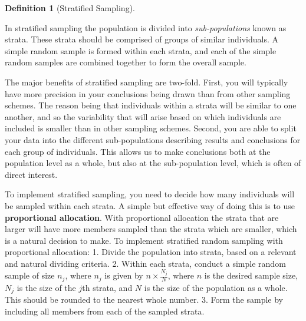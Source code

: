 \documentclass[
  letterpaper,
  DIV=11,
  numbers=noendperiod]{scrreprt}
\theoremstyle{definition}
\theoremstyle{definition}
\theoremstyle{definition}
\newtheorem{definition}{Definition}[chapter]
\theoremstyle{remark}
\begin{document}
\begin{definition}[Stratified
Sampling]\protect\hypertarget{def-stratified-sampling}{}\label{def-stratified-sampling}

In stratified sampling the population is divided into
\emph{sub-populations} known as strata. These strata should be comprised
of groups of similar individuals. A simple random sample is formed
within each strata, and each of the simple random samples are combined
together to form the overall sample.

\end{definition}

The major benefits of stratified sampling are two-fold. First, you will
typically have more precision in your conclusions being drawn than from
other sampling schemes. The reason being that individuals within a
strata will be similar to one another, and so the variability that will
arise based on which individuals are included is smaller than in other
sampling schemes. Second, you are able to split your data into the
different sub-populations describing results and conclusions for each
group of individuals. This allows us to make conclusions both at the
population level as a whole, but also at the sub-population level, which
is often of direct interest.

To implement stratified sampling, you need to decide how many
individuals will be sampled within each strata. A simple but effective
way of doing this is to use \textbf{proportional allocation}. With
proportional allocation the strata that are larger will have more
members sampled than the strata which are smaller, which is a natural
decision to make. To implement stratified random sampling with
proportional allocation: 1. Divide the population into strata, based on
a relevant and natural dividing criteria. 2. Within each strata, conduct
a simple random sample of size \(n_j\), where \(n_j\) is given by
\(n\times\frac{N_j}{N}\), where \(n\) is the desired sample size,
\(N_j\) is the size of the \(j\)th strata, and \(N\) is the size of the
population as a whole. This should be rounded to the nearest whole
number. 3. Form the sample by including all members from each of the
sampled strata.
\end{document}

